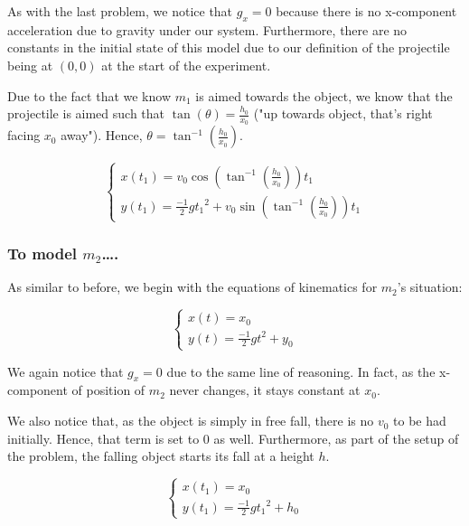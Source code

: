 \documentclass[letterpaper]{article}
\begin{document}
As with the last problem, we notice that \(g_x=0\) because there is no x-component acceleration due to gravity under our system. Furthermore, there are no constants in the initial state of this model due to our definition of the projectile being at \((0,0)\) at the start of the experiment.

Due to the fact that we know \(m_1\) is aimed towards the object, we know that the projectile is aimed such that \(\tan(\theta) = \frac{h_0}{x_0}\) ("up towards object, that's right facing \(x_0\) away"). Hence, \(\theta = \tan^{-1}(\frac{h_0}{x_0})\). 

\begin{equation}
    \begin{cases}
        x(t_1) = v_0\cos(\tan^{-1}(\frac{h_0}{x_0}))t_1 \\
        y(t_1) = \frac{-1}{2}g {t_1}^2 + v_0\sin(\tan^{-1}(\frac{h_0}{x_0})) t_1
    \end{cases}
\end{equation}


\subsubsection{To model \(m_2\)\ldots{}.}
\label{sec:org4afb8bc}
As similar to before, we begin with the equations of kinematics for \(m_2\)'s situation:

\begin{equation}
    \begin{cases}
        x(t) = x_0 \\
        y(t) = \frac{-1}{2}g{t}^2 + y_0
    \end{cases}
\end{equation}

We again notice that \(g_x=0\) due to the same line of reasoning. In fact, as the x-component of position of \(m_2\) never changes, it stays constant at \(x_0\).

We also notice that, as the object is simply in free fall, there is no \(v_0\) to be had initially. Hence, that term is set to \(0\) as well. Furthermore, as part of the setup of the problem, the falling object starts its fall at a height \(h\).

\begin{equation}
    \begin{cases}
        x(t_1) = x_0 \\
        y(t_1) = \frac{-1}{2}g{t_1}^2 + h_0
    \end{cases}
\end{equation}
\end{document}
